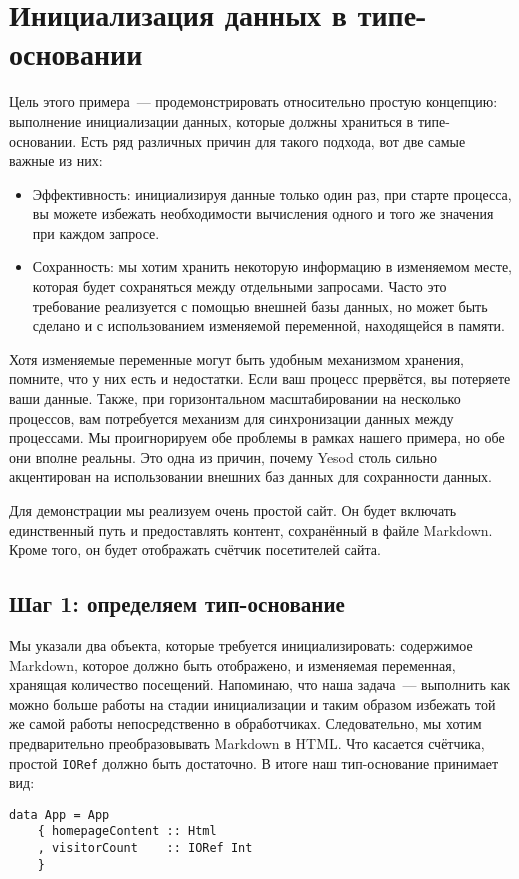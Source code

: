 \chapter{Инициализация данных в типе-основании}

Цель этого примера~--- продемонстрировать относительно простую концепцию:
выполнение инициализации данных, которые должны храниться в типе-основании.
Есть ряд различных причин для такого подхода, вот две самые важные из них:
\begin{itemize}
    \item Эффективность: инициализируя данные только один раз, при старте
        процесса, вы можете избежать необходимости вычисления одного и того же
        значения при каждом запросе.

    \item Сохранность: мы хотим хранить некоторую информацию в изменяемом
        месте, которая будет сохраняться между отдельными запросами. Часто это
        требование реализуется с помощью внешней базы данных, но может быть
        сделано и с использованием изменяемой переменной, находящейся в памяти.
\end{itemize}

\begin{remark}
    Хотя изменяемые переменные могут быть удобным механизмом хранения, помните,
    что у них есть и недостатки. Если ваш процесс прервётся, вы потеряете ваши
    данные. Также, при горизонтальном масштабировании на несколько процессов,
    вам потребуется механизм для синхронизации данных между процессами. Мы
    проигнорируем обе проблемы в рамках нашего примера, но обе они вполне
    реальны. Это одна из причин, почему Yesod столь сильно акцентирован на
    использовании внешних баз данных для сохранности данных.
\end{remark}

Для демонстрации мы реализуем очень простой сайт. Он будет включать
единственный путь и предоставлять контент, сохранённый в файле Markdown. Кроме
того, он будет отображать счётчик посетителей сайта.

\section{Шаг 1: определяем тип-основание}
Мы указали два объекта, которые требуется инициализировать: содержимое
Markdown, которое должно быть отображено, и изменяемая переменная, хранящая
количество посещений. Напоминаю, что наша задача~--- выполнить как можно больше
работы на стадии инициализации и таким образом избежать той же самой работы
непосредственно в обработчиках. Следовательно, мы хотим предварительно
преобразовывать Markdown в HTML. Что касается счётчика, простой
\lstinline'IORef' должно быть достаточно. В итоге наш тип-основание принимает
вид:
\begin{lstlisting}
data App = App
    { homepageContent :: Html
    , visitorCount    :: IORef Int
    }
\end{lstlisting}

